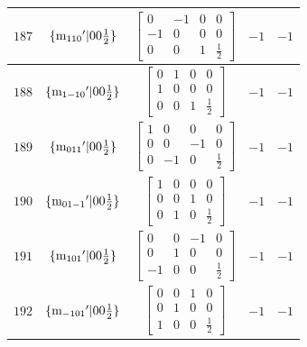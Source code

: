 \documentclass[fleqn,8pt]{jsarticle}
\begin{document}
\begin{longtable}{ccccc}
$ 187 $ & $ \{{\rm m}_{110}{}'|0 0 \frac{1}{2}\} $ & $ \begin{bmatrix} 0 & -1 & 0 & 0 \\ -1 & 0 & 0 & 0 \\ 0 & 0 & 1 & \frac{1}{2} \end{bmatrix} $ & $ -1 $ & $ -1 $ \\ \hline
$ 188 $ & $ \{{\rm m}_{1-10}{}'|0 0 \frac{1}{2}\} $ & $ \begin{bmatrix} 0 & 1 & 0 & 0 \\ 1 & 0 & 0 & 0 \\ 0 & 0 & 1 & \frac{1}{2} \end{bmatrix} $ & $ -1 $ & $ -1 $ \\ \hline
$ 189 $ & $ \{{\rm m}_{011}{}'|0 0 \frac{1}{2}\} $ & $ \begin{bmatrix} 1 & 0 & 0 & 0 \\ 0 & 0 & -1 & 0 \\ 0 & -1 & 0 & \frac{1}{2} \end{bmatrix} $ & $ -1 $ & $ -1 $ \\ \hline
$ 190 $ & $ \{{\rm m}_{01-1}{}'|0 0 \frac{1}{2}\} $ & $ \begin{bmatrix} 1 & 0 & 0 & 0 \\ 0 & 0 & 1 & 0 \\ 0 & 1 & 0 & \frac{1}{2} \end{bmatrix} $ & $ -1 $ & $ -1 $ \\ \hline
$ 191 $ & $ \{{\rm m}_{101}{}'|0 0 \frac{1}{2}\} $ & $ \begin{bmatrix} 0 & 0 & -1 & 0 \\ 0 & 1 & 0 & 0 \\ -1 & 0 & 0 & \frac{1}{2} \end{bmatrix} $ & $ -1 $ & $ -1 $ \\ \hline
$ 192 $ & $ \{{\rm m}_{-101}{}'|0 0 \frac{1}{2}\} $ & $ \begin{bmatrix} 0 & 0 & 1 & 0 \\ 0 & 1 & 0 & 0 \\ 1 & 0 & 0 & \frac{1}{2} \end{bmatrix} $ & $ -1 $ & $ -1 $ \\
\end{longtable}
\end{document}
